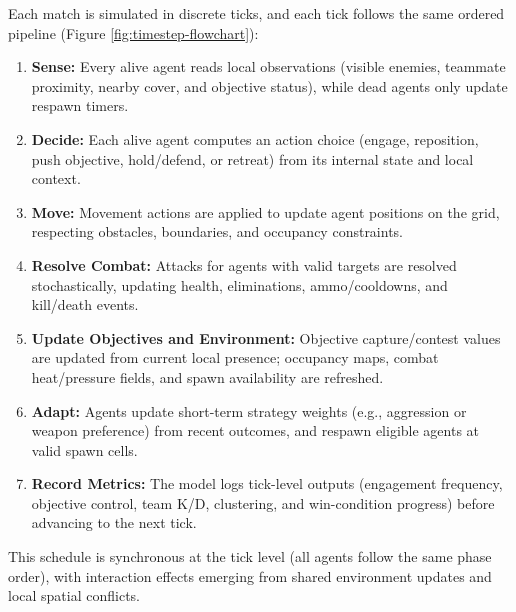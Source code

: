 \documentclass{assignment}
\begin{document}
Each match is simulated in discrete ticks, and each tick follows the same ordered pipeline (Figure \ref{fig:timestep-flowchart}):
\begin{enumerate}
    \item \textbf{Sense:} Every alive agent reads local observations (visible enemies, teammate proximity, nearby cover, and objective status), while dead agents only update respawn timers.
    \item \textbf{Decide:} Each alive agent computes an action choice (engage, reposition, push objective, hold/defend, or retreat) from its internal state and local context.
    \item \textbf{Move:} Movement actions are applied to update agent positions on the grid, respecting obstacles, boundaries, and occupancy constraints.
    \item \textbf{Resolve Combat:} Attacks for agents with valid targets are resolved stochastically, updating health, eliminations, ammo/cooldowns, and kill/death events.
    \item \textbf{Update Objectives and Environment:} Objective capture/contest values are updated from current local presence; occupancy maps, combat heat/pressure fields, and spawn availability are refreshed.
    \item \textbf{Adapt:} Agents update short-term strategy weights (e.g., aggression or weapon preference) from recent outcomes, and respawn eligible agents at valid spawn cells.
    \item \textbf{Record Metrics:} The model logs tick-level outputs (engagement frequency, objective control, team K/D, clustering, and win-condition progress) before advancing to the next tick.
\end{enumerate}
This schedule is synchronous at the tick level (all agents follow the same phase order), with interaction effects emerging from shared environment updates and local spatial conflicts.
\end{document}
